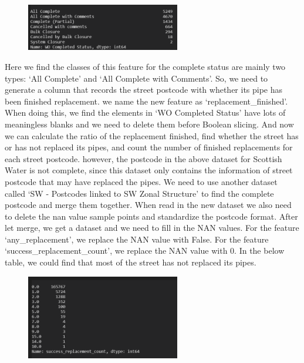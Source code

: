 \documentclass[11pt,twoside]{article}
\numberwithin{Theorem}{section}
\numberwithin{Definition}{section}
\numberwithin{Lemma}{section}
\numberwithin{Algorithm}{section}
\numberwithin{equation}{section}
\begin{document}
\begin{figure}[!ht]
    \centering
    \includegraphics[width=0.6\textwidth]{p10.png}
    \end{figure}

Here we find the classes of this feature for the complete status are mainly two types: ‘All Complete’ and ‘All Complete with Comments’. So, we need to generate a column that records the street postcode with whether its pipe has been finished replacement. we name the new feature as ‘replacement\_finished’. When doing this, we find the elements in ‘WO Completed Status’ have lots of meaningless blanks and we need to delete them before Boolean slicing. And now we can calculate the ratio of the replacement finished, find whether the street has or has not replaced its pipes, and count the number of finished replacements for each street postcode. however, the postcode in the above dataset for Scottish Water is not complete, since this dataset only contains the information of street postcode that may have replaced the pipes. We need to use another dataset called ‘SW - Postcodes linked to SW Zonal Structure’ to find the complete postcode and merge them together. When read in the new dataset we also need to delete the nan value sample points and standardize the postcode format. After let merge, we get a dataset and we need to fill in the NAN values. For the feature ‘any\_replacement’, we replace the NAN value with False. For the feature ‘success\_replacement\_count’, we replace the NAN value with 0. In the below table, we could find that most of the street has not replaced its pipes.

\begin{figure}[!ht]
    \centering
    \includegraphics[width=0.6\textwidth]{p11.png}
    \end{figure}
\end{document}
